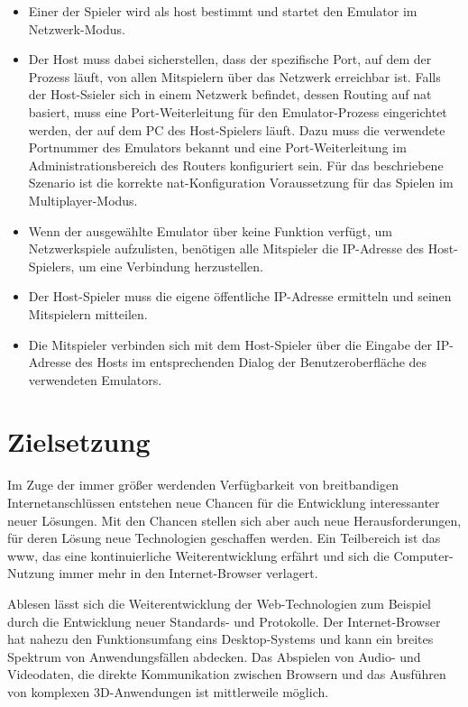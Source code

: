 \begin{itemize}
\tightlist
\item
  Einer der Spieler wird als \gls{host} bestimmt und startet den
  Emulator im Netzwerk-Modus.
\item
  Der Host muss dabei sicherstellen, dass der spezifische Port, auf dem
  der Prozess läuft, von allen Mitspielern über das Netzwerk erreichbar
  ist. Falls der Host-Ssieler sich in einem Netzwerk befindet, dessen
  Routing auf \gls{nat} basiert, muss eine Port-Weiterleitung für den
  Emulator-Prozess eingerichtet werden, der auf dem PC des Host-Spielers
  läuft. Dazu muss die verwendete Portnummer des Emulators bekannt und
  eine Port-Weiterleitung im Administrationsbereich des Routers
  konfiguriert sein. Für das beschriebene Szenario ist die korrekte
  \gls{nat}-Konfiguration Voraussetzung für das Spielen im
  Multiplayer-Modus.
\item
  Wenn der ausgewählte Emulator über keine Funktion verfügt, um
  Netzwerkspiele aufzulisten, benötigen alle Mitspieler die IP-Adresse
  des Host-Spielers, um eine Verbindung herzustellen.
\item
  Der Host-Spieler muss die eigene öffentliche IP-Adresse ermitteln und
  seinen Mitspielern mitteilen.
\item
  Die Mitspieler verbinden sich mit dem Host-Spieler über die Eingabe
  der IP-Adresse des Hosts im entsprechenden Dialog der
  Benutzeroberfläche des verwendeten Emulators.
\end{itemize}

\section{Zielsetzung}\label{zielsetzung}

Im Zuge der immer größer werdenden Verfügbarkeit von breitbandigen
Internetanschlüssen entstehen neue Chancen für die Entwicklung
interessanter neuer Lösungen. Mit den Chancen stellen sich aber auch
neue Herausforderungen, für deren Lösung neue Technologien geschaffen
werden. Ein Teilbereich ist das \gls{www}, das eine kontinuierliche
Weiterentwicklung erfährt und sich die Computer-Nutzung immer mehr in
den Internet-Browser verlagert.

Ablesen lässt sich die Weiterentwicklung der Web-Technologien zum
Beispiel durch die Entwicklung neuer Standards- und Protokolle. Der
Internet-Browser hat nahezu den Funktionsumfang eins Desktop-Systems und
kann ein breites Spektrum von Anwendungsfällen abdecken. Das Abspielen
von Audio- und Videodaten, die direkte Kommunikation zwischen Browsern
und das Ausführen von komplexen 3D-Anwendungen ist mittlerweile möglich.

